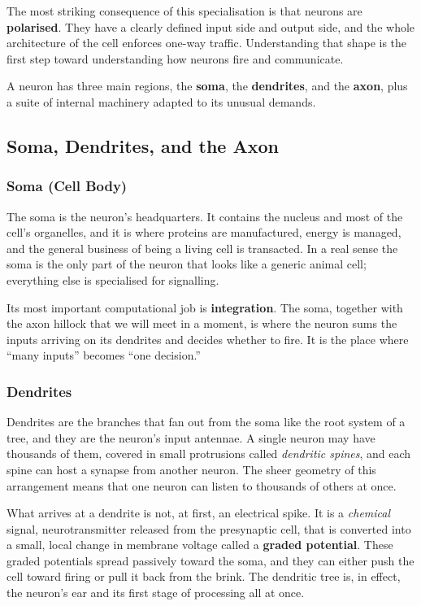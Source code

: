 \documentclass[11pt]{article}
\begin{document}
The most striking consequence of this specialisation is that neurons are \textbf{polarised}. They have a clearly defined input side and output side, and the whole architecture of the cell enforces one-way traffic. Understanding that shape is the first step toward understanding how neurons fire and communicate.

A neuron has three main regions, the \textbf{soma}, the \textbf{dendrites}, and the \textbf{axon}, plus a suite of internal machinery adapted to its unusual demands.

\subsection{Soma, Dendrites, and the Axon}

\subsubsection{Soma (Cell Body)}

The soma is the neuron's headquarters. It contains the nucleus and most of the cell's organelles, and it is where proteins are manufactured, energy is managed, and the general business of being a living cell is transacted. In a real sense the soma is the only part of the neuron that looks like a generic animal cell; everything else is specialised for signalling.

Its most important computational job is \textbf{integration}. The soma, together with the axon hillock that we will meet in a moment, is where the neuron sums the inputs arriving on its dendrites and decides whether to fire. It is the place where ``many inputs'' becomes ``one decision.''

\subsubsection{Dendrites}

Dendrites are the branches that fan out from the soma like the root system of a tree, and they are the neuron's input antennae. A single neuron may have thousands of them, covered in small protrusions called \textit{dendritic spines}, and each spine can host a synapse from another neuron. The sheer geometry of this arrangement means that one neuron can listen to thousands of others at once.

What arrives at a dendrite is not, at first, an electrical spike. It is a \textit{chemical} signal, neurotransmitter released from the presynaptic cell, that is converted into a small, local change in membrane voltage called a \textbf{graded potential}. These graded potentials spread passively toward the soma, and they can either push the cell toward firing or pull it back from the brink. The dendritic tree is, in effect, the neuron's ear and its first stage of processing all at once.
\end{document}
